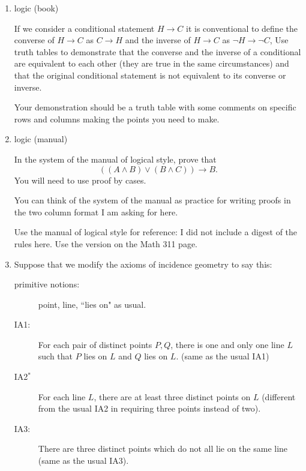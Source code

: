 \documentclass[12pt]{article}
\begin{document}
\begin{enumerate}
\item  logic (book)

If we consider a conditional statement $H \rightarrow C$ it is conventional to define the converse of $H \rightarrow C$ as $C \rightarrow H$ and
the inverse of $H \rightarrow C$ as $\neg H \rightarrow \neg C$,  Use truth tables to demonstrate that the converse and the inverse of a conditional are equivalent to each other (they are true in the same circumstances) and that the original conditional statement is not equivalent to its converse or inverse.

Your demonstration should be a truth table with some comments on specific rows and columns making the points you need to make.

\newpage

\item  logic (manual)

In the system of the manual of logical style, prove that $$((A \wedge B) \vee (B \wedge C)) \rightarrow B.$$  You will need to use proof by cases.

You can think of the system of the manual as practice for writing proofs in the two column format I am asking for here.

Use the manual of logical style for reference:  I did not include a digest of the rules here.  Use the version on the Math 311 page.

\newpage

\item  Suppose that we modify the axioms of incidence geometry to say this:

\begin{description}

\item[primitive notions:]  point, line, ``lies on" as usual.

\item[IA1:]  For each pair of distinct points $P, Q$, there is one and only one line $L$ such that $P$ lies on $L$ and $Q$ lies on $L$. (same as the usual IA1)

\item[IA2$^*$]  For each line $L$, there are at least three distinct points on $L$ (different from the usual IA2 in requiring three points instead of two).

\item[IA3:]  There are three distinct points which do not all lie on the same line (same as the usual IA3).


\end{description}
\end{enumerate}
\end{document}
